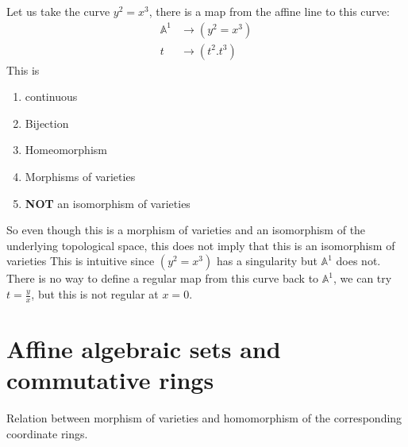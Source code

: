 \begin{example}
    Let us take the curve $y^2 = x^3$, there is a map from the affine line to this curve:\begin{align*}
        \mathbb{A}^1 &\rightarrow (y^2 = x^3)\\
        t&\rightarrow (t^2.t^3)
    \end{align*}
    This is \begin{enumerate}
        \item continuous
        \item Bijection
        \item Homeomorphism
        \item Morphisms of varieties
        \item \textbf{NOT} an isomorphism of varieties
    \end{enumerate}
So even though this is a morphism of varieties and an isomorphism of the underlying topological space, this does not imply that this is an isomorphism of varieties
    This is intuitive since $(y^2 = x^3)$ has a singularity but $\mathbb{A}^1$ does not. There is no way to define a regular map from this curve back to $\mathbb{A}^1$, we can try $t = \frac{y}{x}$, but this is not regular at $x=0$.
\end{example}

\section{Affine algebraic sets and commutative rings}
Relation between morphism of varieties and homomorphism of the corresponding coordinate rings. 

